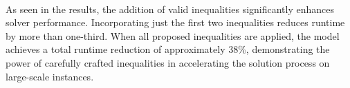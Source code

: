 \paragraph{} As seen in the results, the addition of valid inequalities significantly enhances solver performance. Incorporating just the first two inequalities reduces runtime by more than one-third. When all proposed inequalities are applied, the model achieves a total runtime reduction of approximately 38\%, demonstrating the power of carefully crafted inequalities in accelerating the solution process on large-scale instances.
